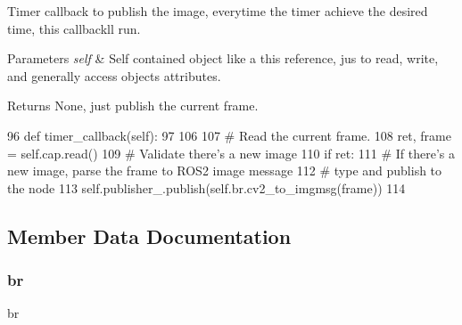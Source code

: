 Timer callback to publish the image, everytime the timer achieve the desired time, this callback\textquotesingle{}ll run. 


\begin{DoxyParams}{Parameters}
{\em self} & Self contained object like a \textquotesingle{}this\textquotesingle{} reference, jus to read, write, and generally access object\textquotesingle{}s attributes.\\
\hline
\end{DoxyParams}
\begin{DoxyReturn}{Returns}
None, just publish the current frame. 
\end{DoxyReturn}

\begin{DoxyCode}
96     \textcolor{keyword}{def }timer\_callback(self):
97         
106 
107         \textcolor{comment}{# Read the current frame.}
108         ret, frame = self.cap.read()
109         \textcolor{comment}{# Validate there's a new image}
110         \textcolor{keywordflow}{if} ret:
111             \textcolor{comment}{# If there's a new image, parse the frame to ROS2 image message}
112             \textcolor{comment}{# type and publish to the node}
113             self.publisher\_.publish(self.br.cv2\_to\_imgmsg(frame))
114 
\end{DoxyCode}


\subsection{Member Data Documentation}
\mbox{\label{classtoxic__vision_1_1webcam__pub_1_1ImagePublisher_a88f0860257ba6bdc089557444f5cdd16}} 
\subsubsection{\texorpdfstring{br}{br}}
{\footnotesize\ttfamily br}

\mbox{\label{classtoxic__vision_1_1webcam__pub_1_1ImagePublisher_a9499a5c7f196d66c6afe0222bd5a9219}} 
